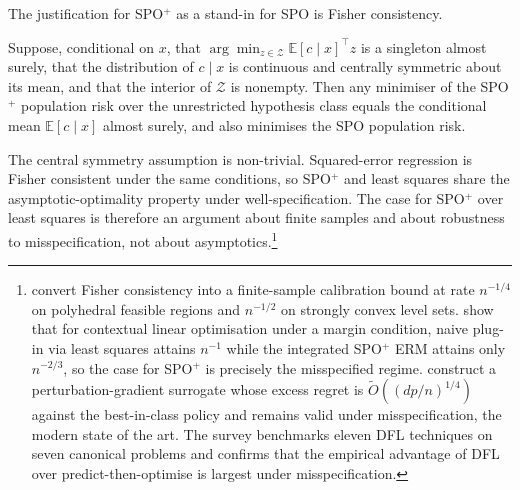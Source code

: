 The justification for SPO$^+$ as a stand-in for SPO is Fisher consistency.

\begin{theorem}
\label{thm:spo_fisher}
Suppose, conditional on $x$, that $\arg\min_{z \in \mathcal Z} \mathbb
E[c \mid x]^\top z$ is a singleton almost surely, that the distribution of
$c \mid x$ is continuous and centrally symmetric about its mean, and that
the interior of $\mathcal Z$ is nonempty. Then any minimiser of the SPO$^+$
population risk over the unrestricted hypothesis class equals the
conditional mean $\mathbb E[c \mid x]$ almost surely, and also minimises
the SPO population risk.
\end{theorem}

The central symmetry assumption is non-trivial. Squared-error regression
is Fisher consistent under the same conditions, so SPO$^+$ and least
squares share the asymptotic-optimality property under
well-specification. The case for SPO$^+$ over least squares is therefore
an argument about finite samples and about robustness to misspecification,
not about asymptotics.\footnote{\citet{LiuGrigas2021} convert Fisher
consistency into a finite-sample calibration bound at rate $n^{-1/4}$ on
polyhedral feasible regions and $n^{-1/2}$ on strongly convex level sets.
\citet{HuKallus2020} show that for contextual linear optimisation under a
margin condition, naive plug-in via least squares attains $n^{-1}$ while
the integrated SPO$^+$ ERM attains only $n^{-2/3}$, so the case for
SPO$^+$ is precisely the misspecified regime. \citet{HuangGupta2024}
construct a perturbation-gradient surrogate whose excess regret is
$\widetilde O((dp/n)^{1/4})$ against the best-in-class policy and remains
valid under misspecification, the modern state of the art. The
\citet{Mandi2024} survey benchmarks eleven DFL techniques on seven
canonical problems and confirms that the empirical advantage of DFL over
predict-then-optimise is largest under misspecification.}

